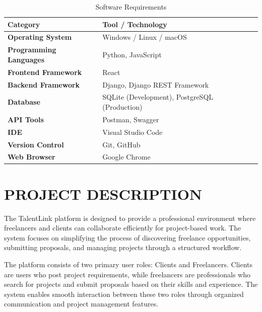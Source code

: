 \documentclass[12pt,a4paper,oneside]{report}
\numberwithin{figure}{chapter}
\numberwithin{table}{chapter}
\begin{document}
\begin{table}[H]
  \centering
  \caption{Software Requirements}
  \begin{tabularx}{0.85\textwidth}{|>{\bfseries}l|X|}
    \hline
    \textbf{Category}        & \textbf{Tool / Technology} \\
    \hline
    Operating System         & Windows / Linux / macOS \\
    \hline
    Programming Languages    & Python, JavaScript \\
    \hline
    Frontend Framework       & React \\
    \hline
    Backend Framework        & Django, Django REST Framework \\
    \hline
    Database                 & SQLite (Development), PostgreSQL (Production) \\
    \hline
    API Tools                & Postman, Swagger \\
    \hline
    IDE                      & Visual Studio Code \\
    \hline
    Version Control          & Git, GitHub \\
    \hline
    Web Browser              & Google Chrome \\
    \hline
  \end{tabularx}
  \label{tab:software}
\end{table}

\chapter{PROJECT DESCRIPTION}

The TalentLink platform is designed to provide a professional environment where
freelancers and clients can collaborate efficiently for project-based work. The system
focuses on simplifying the process of discovering freelance opportunities, submitting
proposals, and managing projects through a structured workflow.

\indent The platform consists of two primary user roles: Clients and Freelancers. Clients
are users who post project requirements, while freelancers are professionals who search
for projects and submit proposals based on their skills and experience. The system enables
smooth interaction between these two roles through organized communication and project
management features.
\end{document}
